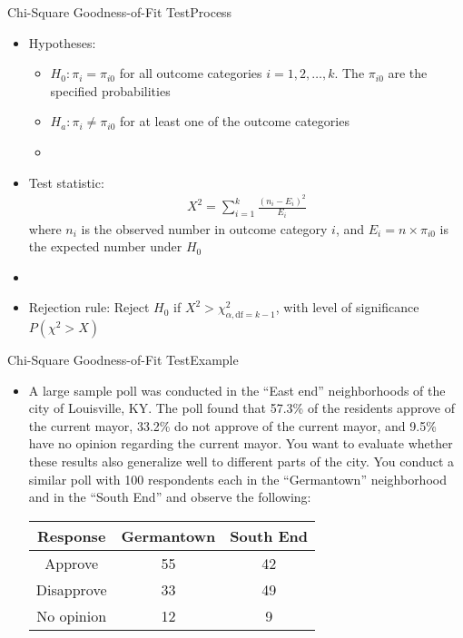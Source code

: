 \documentclass[xcolor=dvipsnames]{beamer}
\begin{document}
\begin{frame}{Chi-Square Goodness-of-Fit Test}{Process}
	\begin{itemize}
		\item Hypotheses:
		\begin{itemize}
			\item $H_0: \pi_i = \pi_{i0}$ for all outcome categories $i = 1, 2, \hdots, k$. The $\pi_{i0}$ are the specified probabilities \pause
			\item $H_a: \pi_i \neq \pi_{i0}$ for at least one of the outcome categories \pause
			\item[]
		\end{itemize}
	\item Test statistic: \pause
	\begin{gather*}
		X^2 = \sum_{i=1}^k \frac{(n_i-E_i)^2}{E_i}
	\end{gather*} 
	where $n_i$ is the observed number in outcome category $i$, and $E_i=n \times \pi_{i0}$ is the expected number under $H_0$ \pause
	\item[]
	\item Rejection rule: Reject $H_0$ if $X^2 > \chi_{\alpha,\text{df}=k-1}^2$, with level of significance $P(\chi^2 > X)$
	\end{itemize}
\end{frame}

\begin{frame}{Chi-Square Goodness-of-Fit Test}{Example}
	\begin{itemize}
		\item A large sample poll was conducted in the ``East end'' neighborhoods of the city of Louisville, KY. The poll found that 57.3\% of the residents approve of the current mayor, 33.2\% do not approve of the current mayor, and 9.5\% have no opinion regarding the current mayor. You want to evaluate whether these results also generalize well to different parts of the city. You conduct a similar poll with 100 respondents each in the ``Germantown'' neighborhood and in the ``South End'' and observe the following: \pause
		\vspace{2mm}
		\begin{center}
			\begin{tabular}{ccc}
				\hline
				Response & Germantown & South End \\ \hline \hline
				Approve & 55 & 42\\
				Disapprove & 33 & 49 \\
				No opinion & 12 & 9 \\ \hline
			\end{tabular}
		\end{center}
	\end{itemize}
\end{frame}
\end{document}
